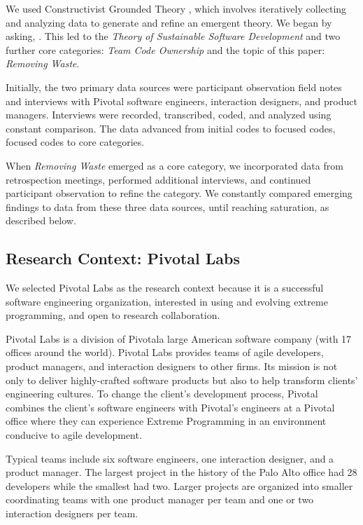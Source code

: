 We used Constructivist Grounded Theory \cite{Charmaz}, which involves iteratively collecting and analyzing data to generate and refine an emergent theory. We began by asking, . This led to the \textit{Theory of Sustainable Software Development} \cite{SedanoSustainableSoftware} and two further core categories: \textit{Team Code Ownership} \cite{SedanoTeamCodeOwnership} and the topic of this paper: \textit{Removing Waste}.

Initially, the two primary data sources were participant observation field notes and interviews with Pivotal software engineers, interaction designers, and product managers. Interviews were recorded, transcribed, coded, and analyzed using constant comparison. The data advanced from initial codes to focused codes, focused codes to core categories.

When \textit{Removing Waste} emerged as a core category, we incorporated data from retrospection meetings, performed additional interviews, and continued participant observation to refine the category.  We constantly compared emerging findings to data from these three data sources, until reaching saturation, as described below.

\subsection{Research Context: Pivotal Labs}
We selected Pivotal Labs as the research context because it is a successful software engineering organization, interested in using and evolving extreme programming, and open to research collaboration. 

Pivotal Labs is a division of Pivotal\textemdash a large American software company (with 17 offices around the world). Pivotal Labs provides teams of agile developers, product managers, and interaction designers to other firms. Its mission is not only to deliver highly-crafted software products but also to help transform clients' engineering cultures. To change the client's development process, Pivotal combines the client's software engineers with Pivotal's engineers at a Pivotal office where they can experience Extreme Programming \cite{BeckExtremeProgramming2004} in an environment conducive to agile development. 

Typical teams include six software engineers, one interaction designer, and a product manager. The largest project in the history of the Palo Alto office had 28 developers while the smallest had two. Larger projects are organized into smaller coordinating teams with one product manager per team and one or two interaction designers per team.

